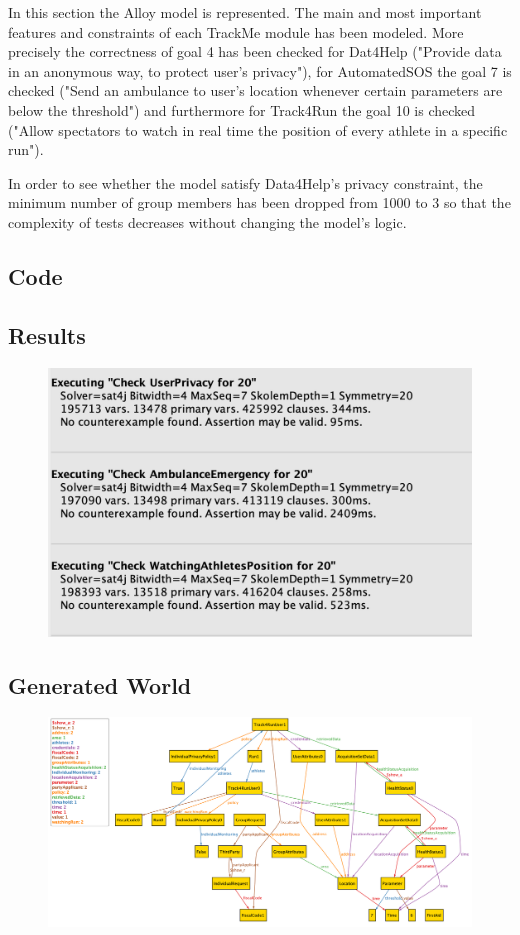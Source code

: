 In this section the Alloy model is represented. The main and most important features and constraints of each TrackMe module has been modeled. More precisely the correctness of goal 4 has been checked for Dat4Help ("Provide data in an anonymous way, to protect user’s privacy"), for AutomatedSOS the goal 7 is checked ("Send an ambulance to user’s location whenever certain parameters are below the threshold") and furthermore for Track4Run the goal 10 is checked ("Allow spectators to watch in real time the position of every athlete in a specific run").

In order to see whether the model satisfy Data4Help's privacy constraint, the minimum number of group members has been dropped from 1000 to 3 so that the complexity of tests decreases without changing the model's logic. 

\subsection{Code}

\subsection{Results}
\begin{figure}[H]
\centering
\includegraphics[scale=0.7]{Images/alloyResult.png}
\end{figure}
\subsection{Generated World}
\begin{figure}[H]
\centering
\includegraphics[scale=0.4]{Images/alloyGeneratedWorld.png}
\end{figure}